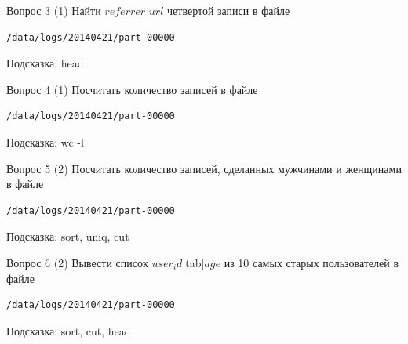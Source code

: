 \documentclass[10pt,a4paper]{beamer}
\begin{document}

\begin{frame}[fragile]{}

\begin{alertblock}{Вопрос 3 (1)}
Найти $referrer\_url$ четвертой записи в файле
\begin{shaded}
{\color{green} \begin{verbatim}
/data/logs/20140421/part-00000
\end{verbatim}}
\end{shaded}
Подсказка: head
\end{alertblock}

\end{frame}


\begin{frame}[fragile]{}

\begin{alertblock}{Вопрос 4 (1)}
Посчитать количество записей в файле
\begin{shaded}
{\color{green} \begin{verbatim}
/data/logs/20140421/part-00000
\end{verbatim}}
\end{shaded}
Подсказка: wc -l
\end{alertblock}

\end{frame}


\begin{frame}[fragile]{}

\begin{alertblock}{Вопрос 5 (2)}
Посчитать количество записей, сделанных мужчинами и женщинами в файле
\begin{shaded}
{\color{green} \begin{verbatim}
/data/logs/20140421/part-00000
\end{verbatim}}
\end{shaded}
Подсказка: sort, uniq, cut
\end{alertblock}

\end{frame}


\begin{frame}[fragile]{}

\begin{alertblock}{Вопрос 6 (2)}
Вывести список $user_id$[tab]$age$ из 10 самых старых пользователей в файле
\begin{shaded}
{\color{green} \begin{verbatim}
/data/logs/20140421/part-00000
\end{verbatim}}
\end{shaded}
Подсказка: sort, cut, head
\end{alertblock}

\end{frame}
\end{document}
